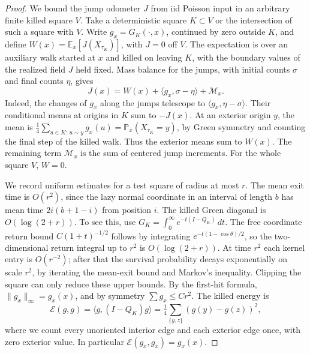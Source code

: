 \documentclass[11pt]{amsart}
\newcommand{\E}{\mathbb E}
\newcommand{\Prob}{\mathbb P}
\newcommand{\1}{\mathbf 1}
\newcommand{\calE}{\mathcal E}
\begin{document}
\begin{proof}
We bound the jump odometer \(J\) from iid Poisson input in an arbitrary finite killed square \(V\). Take a deterministic square \(K\subset V\) or the intersection of such a square with \(V\). Write \(g_x=G_K(\cdot,x)\), continued by zero outside \(K\), and define \(W(x)=\E_x[J(X_{\tau_K})]\), with \(J=0\) off \(V\). The expectation is over an auxiliary walk started at \(x\) and killed on leaving \(K\), with the boundary values of the realized field \(J\) held fixed. Mass balance for the jumps, with initial counts \(\sigma\) and final counts \(\eta\), gives
\begin{equation}\label{e:mass}
 J(x)=W(x)+\langle g_x,\sigma-\eta\rangle+\mathcal M_x .
\end{equation}
Indeed, the changes of \(g_x\) along the jumps telescope to \(\langle g_x,\eta-\sigma\rangle\). Their conditional means at origins in \(K\) sum to \(-J(x)\). At an exterior origin \(y\), the mean is \(\tfrac14\sum_{u\in K:\,u\sim y}g_x(u)=\Prob_x(X_{\tau_K}=y)\), by Green symmetry and counting the final step of the killed walk. Thus the exterior means sum to \(W(x)\). The remaining term \(\mathcal M_x\) is the sum of centered jump increments. For the whole square \(V\), \(W=0\).

We record uniform estimates for a test square of radius at most \(r\). The mean exit time is \(O(r^2)\), since the lazy normal coordinate in an interval of length \(b\) has mean time \(2i(b+1-i)\) from position \(i\). The killed Green diagonal is \(O(\log(2+r))\). To see this, use \(G_K=\int_0^\infty e^{-t(I-Q_K)}\,dt\). The free coordinate return bound \(C(1+t)^{-1/2}\) follows by integrating \(e^{-t(1-\cos\theta)/2}\), so the two-dimensional return integral up to \(r^2\) is \(O(\log(2+r))\). At time \(r^2\) each kernel entry is \(O(r^{-2})\); after that the survival probability decays exponentially on scale \(r^2\), by iterating the mean-exit bound and Markov's inequality. Clipping the square can only reduce these upper bounds. By the first-hit formula, \(\|g_x\|_\infty=g_x(x)\), and by symmetry \(\sum g_x\le Cr^2\). The killed energy is
\[
 \calE(g,g)=\langle g,(I-Q_K)g\rangle
       =\tfrac14\sum_{\{y,z\}}(g(y)-g(z))^2 ,
\]
where we count every unoriented interior edge and each exterior edge once, with zero exterior value. In particular \(\calE(g_x,g_x)=g_x(x)\).


\end{proof}
\end{document}
